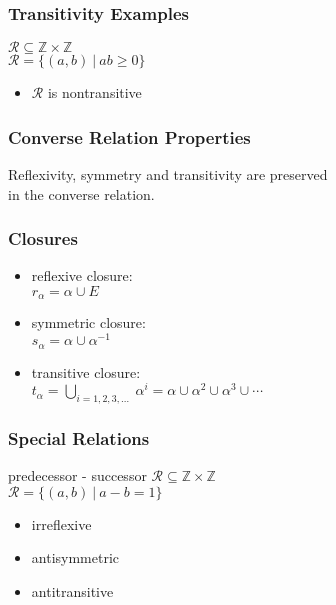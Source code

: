 \documentclass[dvipsnames]{beamer}
\begin{document}
\begin{frame}
  \frametitle{Transitivity Examples}

  $\mathcal{R} \subseteq \mathbb{Z} \times \mathbb{Z}$\\
  $\mathcal{R} = \{(a,b)~|~ab \geq 0\}$

  \medskip
  \begin{itemize}
    \item $\mathcal{R}$ is nontransitive
  \end{itemize}
\end{frame}

\begin{frame}
  \frametitle{Converse Relation Properties}

  \begin{theorem}
    Reflexivity, symmetry and transitivity are preserved\\
    in the converse relation.
  \end{theorem}
\end{frame}

\begin{frame}
  \frametitle{Closures}

  \begin{itemize}
    \item reflexive closure:\\
      $r_{\alpha} = \alpha \cup E$

    \pause
    \medskip
    \item symmetric closure:\\
      $s_{\alpha} = \alpha \cup \alpha^{-1}$

    \pause
    \medskip
    \item transitive closure:\\
      $t_{\alpha} = \bigcup_{i=1,2,3, \ldots}~\alpha^i
        = \alpha \cup \alpha^2 \cup \alpha^3 \cup \cdots$
  \end{itemize}
\end{frame}


\begin{frame}
  \frametitle{Special Relations}

  \begin{block}{predecessor - successor}
    $\mathcal{R} \subseteq \mathbb{Z} \times \mathbb{Z}$\\
    $\mathcal{R} = \{(a,b)~|~a-b=1\}$
  \end{block}

  \medskip
  \begin{itemize}
    \item irreflexive
    \item antisymmetric
    \item antitransitive
  \end{itemize}
\end{frame}
\end{document}
